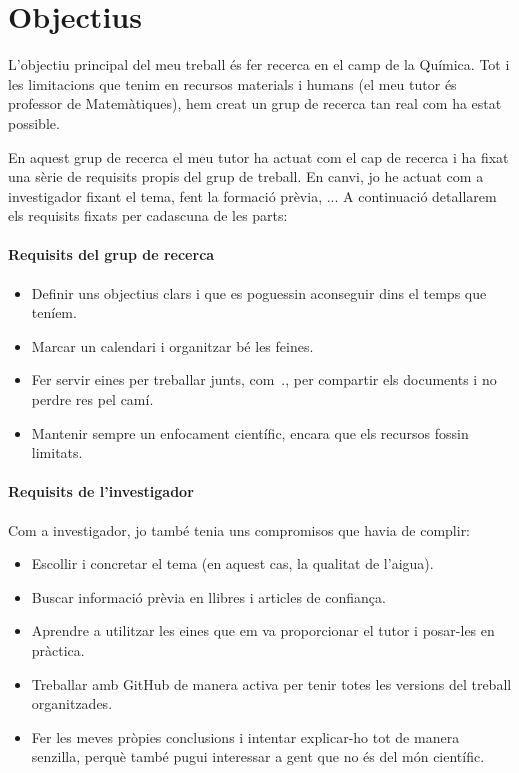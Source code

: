 \chapter{Objectius}

L'objectiu principal del meu treball és fer recerca en el camp de la Química. Tot i les limitacions que tenim en recursos materials i humans (el meu tutor és professor de Matemàtiques), hem creat un grup de recerca tan real com ha estat possible.

En aquest grup de recerca el meu tutor ha actuat com el cap de recerca i ha fixat una sèrie de requisits propis del grup de treball. En canvi, jo he actuat com a investigador fixant el tema, fent la formació prèvia, ...
A continuació detallarem els requisits fixats per cadascuna de les parts:

\subsubsection*{Requisits del grup de recerca}
\begin{itemize}
    \item Definir uns objectius clars i que es poguessin aconseguir dins el temps que teníem.
    \item Marcar un calendari i organitzar bé les feines.
    \item Fer servir eines per treballar junts, com~., per compartir els documents i no perdre res pel camí.
    \item Mantenir sempre un enfocament científic, encara que els recursos fossin limitats.
\end{itemize}

\subsubsection*{Requisits de l'investigador}
Com a investigador, jo també tenia uns compromisos que havia de complir:
\begin{itemize}
    \item Escollir i concretar el tema (en aquest cas, la qualitat de l’aigua).
    \item Buscar informació prèvia en llibres i articles de confiança.
    \item Aprendre a utilitzar les eines que em va proporcionar el tutor i posar-les en pràctica.
    \item Treballar amb GitHub de manera activa per tenir totes les versions del treball organitzades.
    \item Fer les meves pròpies conclusions i intentar explicar-ho tot de manera senzilla, perquè també pugui interessar a gent que no és del món científic.
\end{itemize}

